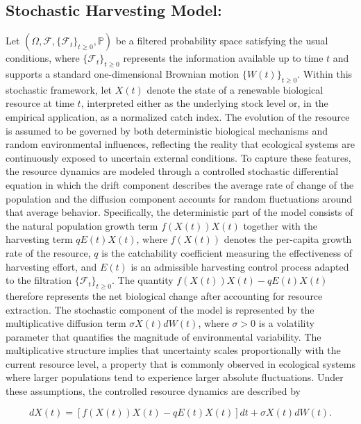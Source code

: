 \documentclass[11pt]{article}
\begin{document}
	\subsection{Stochastic Harvesting Model:}
	Let $(\Omega,\mathcal{F},\{\mathcal{F}_t\}_{t\geq0},\mathbb{P})$ be a filtered probability space satisfying the usual conditions, where $\{\mathcal{F}_t\}_{t\geq0}$ represents the information available up to time $t$ and supports a standard one-dimensional Brownian motion $\{W(t)\}_{t\geq0}$. Within this stochastic framework, let $X(t)$ denote the state of a renewable biological resource at time $t$, interpreted either as the underlying stock level or, in the empirical application, as a normalized catch index. The evolution of the resource is assumed to be governed by both deterministic biological mechanisms and random environmental influences, reflecting the reality that ecological systems are continuously exposed to uncertain external conditions. To capture these features, the resource dynamics are modeled through a controlled stochastic differential equation in which the drift component describes the average rate of change of the population and the diffusion component accounts for random fluctuations around that average behavior. Specifically, the deterministic part of the model consists of the natural population growth term $f(X(t))X(t)$ together with the harvesting term $qE(t)X(t)$, where $f(X(t))$ denotes the per-capita growth rate of the resource, $q$ is the catchability coefficient measuring the effectiveness of harvesting effort, and $E(t)$ is an admissible harvesting control process adapted to the filtration $\{\mathcal{F}_t\}_{t\geq0}$. The quantity $f(X(t))X(t)-qE(t)X(t)$ therefore represents the net biological change after accounting for resource extraction. The stochastic component of the model is represented by the multiplicative diffusion term $\sigma X(t)dW(t)$, where $\sigma>0$ is a volatility parameter that quantifies the magnitude of environmental variability. The multiplicative structure implies that uncertainty scales proportionally with the current resource level, a property that is commonly observed in ecological systems where larger populations tend to experience larger absolute fluctuations. Under these assumptions, the controlled resource dynamics are described by
	
	\begin{equation}
		dX(t)=
		\left[
		f(X(t))X(t)-qE(t)X(t)
		\right]dt
		+
		\sigma X(t)dW(t).
		\label{eq:sde_model}
	\end{equation}
	
\end{document}
